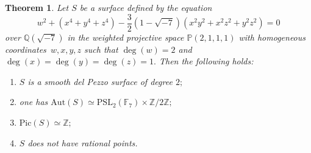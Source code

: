 \documentclass[10pt,a4paper]{amsart}
\newtheorem{Th}{Theorem}
\begin{document}
\begin{Th}\label{th:nopoints}
Let $S$ be a surface defined by the equation
$$
w^2+(x^4+y^4+z^4)-\frac{3}{2}(1-\sqrt{-7})(x^2y^2+x^2z^2+y^2z^2)=0
$$
\noindent over $\mathbb{Q}(\sqrt{-7})$ in the weighted projective space $\mathbb{P}(2,1,1,1)$ with  homogeneous coordinates~$w,x,y,z$ such that $\deg(w)=2$ and $\deg(x)=\deg(y)=\deg(z)=1.$ Then the following holds:
\begin{enumerate}
\renewcommand\labelenumi{\rm (\roman{enumi})}
\renewcommand\theenumi{\rm (\roman{enumi})}


\item\label{conditiondp2}
$S$ is a smooth del Pezzo surface of degree $2;$


\item\label{conditionAut}
one has $\mathrm{Aut}(S)\simeq \mathrm{PSL}_2(\mathbb{F}_7) \times \mathbb{Z}/2\mathbb{Z};$

\item\label{conditionPic}
$\mathrm{Pic}(S) \simeq \mathbb{Z};$

\item\label{conditionnopoint}
$S$ does not have rational points.



\end{enumerate}


\end{Th}
\end{document}
